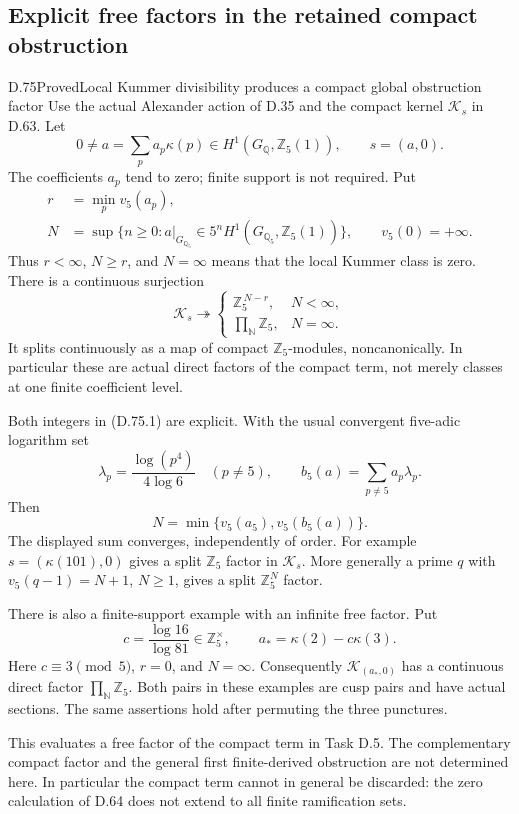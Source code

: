 \subsection{Explicit free factors in the retained compact obstruction}

\begin{statement}{D.75}{Proved}{Local Kummer divisibility produces a compact global obstruction factor}
Use the actual Alexander action of D.35 and the compact kernel
\(\mathcal K_s\) in D.63. Let
\[
 0\ne a=\sum_p a_p\kappa(p)\in H^1(G_{\mathbb Q},\mathbb Z_5(1)),
 \qquad s=(a,0).
\]
The coefficients \(a_p\) tend to zero; finite support is not required.
Put
\[
 \begin{split}
 r&=\min_p v_5(a_p),\\
 N&=\sup\{n\ge0:a|_{G_{\mathbb Q_5}}\in
                   5^nH^1(G_{\mathbb Q_5},\mathbb Z_5(1))\},
 \qquad v_5(0)=+\infty .
 \end{split}                                               \tag{D.75.1}
\]
Thus \(r<\infty\), \(N\ge r\), and \(N=\infty\) means that the
local Kummer class is zero. There is a continuous surjection
\[
 \mathcal K_s\twoheadrightarrow
 \begin{cases}
       \mathbb Z_5^{\,N-r},&N<\infty,\\
       \displaystyle\prod_{\mathbb N}\mathbb Z_5,&N=\infty .
 \end{cases}                                               \tag{D.75.2}
\]
It splits continuously as a map of compact \(\mathbb Z_5\)-modules,
noncanonically. In particular these are actual direct factors of the
compact term, not merely classes at one finite coefficient level.

Both integers in (D.75.1) are explicit. With the usual convergent
five-adic logarithm set
\[
 \lambda_p=\frac{\log(p^4)}{4\log 6}\quad(p\ne5),\qquad
 b_5(a)=\sum_{p\ne5}a_p\lambda_p.
\]
Then
\[
                    N=\min\{v_5(a_5),v_5(b_5(a))\}.         \tag{D.75.3}
\]
The displayed sum converges, independently of order.
For example \(s=(\kappa(101),0)\) gives a split
\(\mathbb Z_5\) factor in \(\mathcal K_s\). More generally a prime
\(q\) with \(v_5(q-1)=N+1\), \(N\ge1\), gives a split
\(\mathbb Z_5^N\) factor.

There is also a finite-support example with an infinite free factor.
Put
\[
 c=\frac{\log 16}{\log 81}\in\mathbb Z_5^\times,\qquad
 a_*=\kappa(2)-c\kappa(3).
                                                               \tag{D.75.4}
\]
Here \(c\equiv3\pmod5\), \(r=0\), and \(N=\infty\).
Consequently \(\mathcal K_{(a_*,0)}\) has a continuous direct
factor \(\prod_{\mathbb N}\mathbb Z_5\). Both pairs in these
examples are cusp pairs and have actual sections.
The same assertions hold after permuting the three punctures.

This evaluates a free factor of the compact term in Task D.5.
The complementary compact factor and the general first
finite-derived obstruction are not determined here.
In particular the compact term cannot in general be discarded:
the zero calculation of D.64 does not extend to all finite
ramification sets.
\end{statement}

